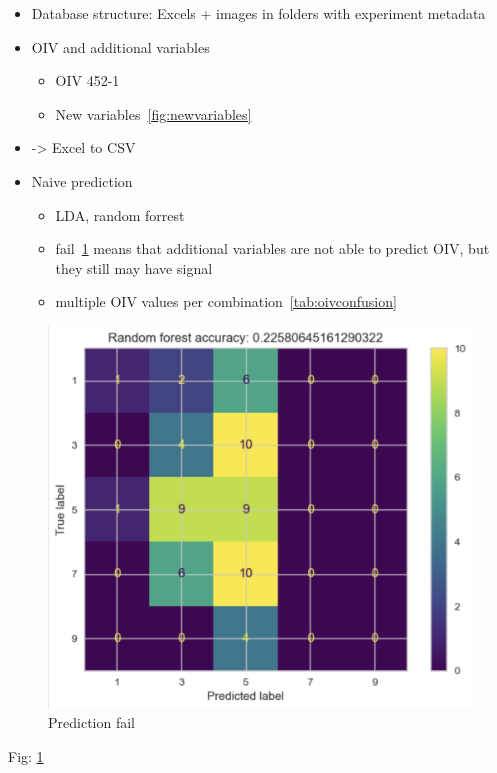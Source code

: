 \documentclass[english]{article}
\begin{document}
\begin{itemize}
	\item Database structure: Excels + images in folders with experiment metadata
	\item OIV and additional variables
	      \begin{itemize}
		      \item OIV 452-1
		      \item New variables~\ref*{fig:newvariables}
	      \end{itemize}
	\item -> Excel to CSV
	\item Naive prediction
	      \begin{itemize}
		      \item LDA, random forrest
		      \item fail~\ref{fig:predictionfail} means that additional variables are not able to predict OIV, but they still may have signal
		      \item multiple OIV values per combination~\ref*{tab:oivconfusion}
	      \end{itemize}
\end{itemize}

\begin{figure}[H]
	\begin{center}
		\includegraphics[width=0.7\linewidth,trim={1mm 0 0 0},clip]{annotations_da_rfc_cm.png}
		\caption{Prediction fail}\label{fig:predictionfail}
	\end{center}
\end{figure}
Fig: \ref{fig:predictionfail}
\end{document}
